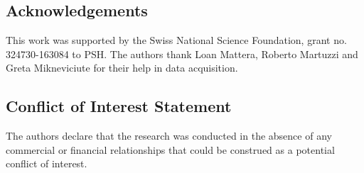 \subsection*{Acknowledgements}
This work was supported by the Swiss National Science Foundation, grant no. 324730-163084 to PSH. The authors thank Loan Mattera, Roberto Martuzzi and Greta Mikneviciute for their help in data acquisition. 

\subsection*{Conflict of Interest Statement}
The authors declare that the research was conducted in the absence of any commercial or financial relationships that could be construed as a potential conflict of interest.








